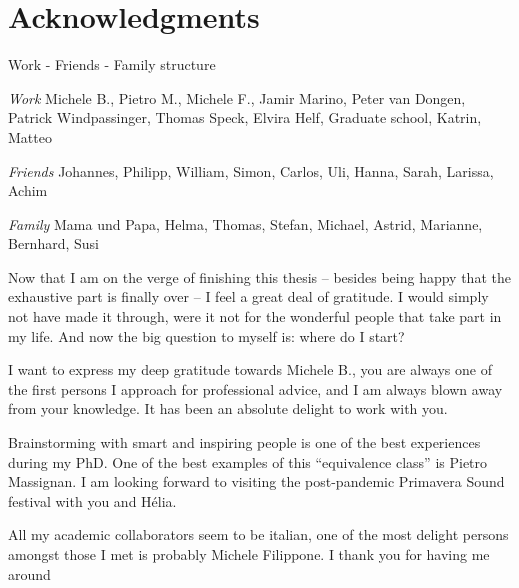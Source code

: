 \chapter*{Acknowledgments}
Work - Friends - Family structure

{\it Work} Michele B., Pietro M., Michele F., Jamir Marino, Peter van Dongen, Patrick Windpassinger, Thomas Speck, Elvira Helf, Graduate school, Katrin, Matteo

{\it Friends} Johannes, Philipp, William, Simon, Carlos, Uli, Hanna, Sarah, Larissa, Achim

{\it Family} Mama und Papa, Helma, Thomas, Stefan, Michael, Astrid, Marianne, Bernhard, Susi


Now that I am on the verge of finishing this thesis -- besides being happy that the exhaustive part is finally over -- I feel a great deal of gratitude.
I would simply not have made it through, were it not for the wonderful people that take part in my life.
And now the big question to myself is: where do I start?

I want to express my deep gratitude towards Michele B., you are always one of the first persons I approach for professional advice, and I am always blown away from your knowledge.
It has been an absolute delight to work with you.

Brainstorming with smart and inspiring people is one of the best experiences during my PhD.
One of the best examples of this ``equivalence class'' is Pietro Massignan.
I am looking forward to visiting the post-pandemic Primavera Sound festival with you and Hélia.

All my academic collaborators seem to be italian, one of the most delight persons amongst those I met is probably Michele Filippone.
I thank you for having me around
